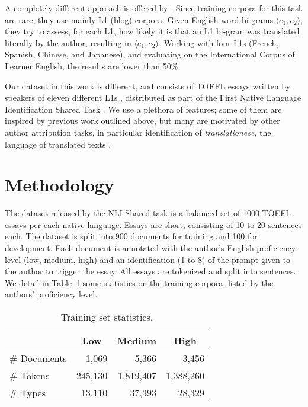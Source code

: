 \documentclass[11pt,letterpaper]{article}
\newcommand{\Tref}[1]{Table~\ref{#1}}
\begin{document}
A completely different approach is offered by
\citet{brooke2011native}. Since training corpora for this task are
rare, they use mainly L1 (blog) corpora. Given English word bi-grams
$\langle e_1,e_2\rangle$, they try to assess, for each L1, how likely
it is that an L1 bi-gram was translated literally by the author,
resulting in $\langle e_1,e_2\rangle$. Working with four L1s (French,
Spanish, Chinese, and Japanese), and evaluating on the International
Corpus of Learner English, the results are lower than 50\%.

Our dataset in this work is different, and consists of TOEFL essays
written by speakers of eleven different L1s
\citep{blanchard-tetreault-higgins-cahill-chodorow:2013:TOEFL11-RR},
distributed as part of the First Native Language Identification Shared
Task \citep{tetreault-blanchard-cahill:2013:BEA}. We use a plethora of
features; some of them are inspired by previous work outlined above,
but many are motivated by other author attribution tasks, in
particular identification of \emph{translationese}, the language of
translated texts \citep{vered:noam:shuly}.

\section{Methodology}
\label{sec:methodology}
The dataset released by the NLI Shared task \citep{tetreault-EtAl:2012:PAPERS} is a balanced set of 1000 TOEFL essays per each native language. Essays are short, consisting of 10 to 20 sentences each. The dataset is split into 900 documents for training and 100 for development. Each document is annotated with the author's English proficiency level (low, medium, high) and an identification (1 to 8) of the prompt given to the author to trigger the essay. All essays are tokenized and split into sentences. We detail in \Tref{tbl:stats:level} some statistics on the training corpora, listed by the authors' proficiency level.

\begin{table}[hbt]
\small\centering
\begin{tabular}{lrrr}
  & \multicolumn{1}{c}{\textbf{Low}} & \multicolumn{1}{c}{\textbf{Medium}} & \multicolumn{1}{c}{\textbf{High}} \\
\hline
\# Documents & 1,069 & 5,366 & 3,456 \\
\# Tokens & 245,130 & 1,819,407 & 1,388,260 \\ 
\# Types & 13,110 & 37,393 & 28,329 \\ 
\end{tabular}
\caption{Training set statistics.}
\label{tbl:stats:level}
\end{table} 
\end{document}
